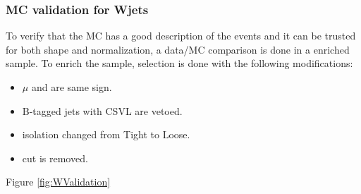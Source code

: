 \subsubsection{MC validation for Wjets}
To verify that the MC has a good description of the \wjets events and it can be trusted for both shape and normalization, a data/MC comparison 
is done in a \wjets enriched sample. To enrich the sample, \muTau selection is done with the following modifications:
\begin{itemize}
\item $\mu$ and \Tau are same sign.
\item B-tagged jets with CSVL are vetoed.
\item \Tau isolation changed from Tight to Loose.
\item \tauMT cut is removed.
\end{itemize}
Figure \ref{fig:WValidation} 

